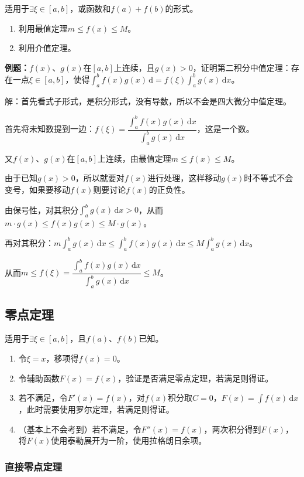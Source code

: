 适用于$\exists\xi\in[a,b]$，或函数和$f(a)+f(b)$的形式。

\begin{enumerate}
    \item 利用最值定理$m\leqslant f(x)\leqslant M$。
    \item 利用介值定理。
\end{enumerate}

\textbf{例题：}$f(x)$、$g(x)$在$[a,b]$上连续，且$g(x)>0$，证明第二积分中值定理：存在一点$\xi\in[a,b]$，使得$\int_a^bf(x)g(x)\,\textrm{d}=f(\xi)\int_a^bg(x)\,\textrm{d}x$。

解：首先看式子形式，是积分形式，没有导数，所以不会是四大微分中值定理。

首先将未知数提到一边：$f(\xi)=\dfrac{\int_a^bf(x)g(x)\,\textrm{d}x}{\int_a^bg(x)\,\textrm{d}x}$，这是一个数。

又$f(x)$、$g(x)$在$[a,b]$上连续，由最值定理$m\leqslant f(x)\leqslant M$。

由于已知$g(x)>0$，所以就要对$f(x)$进行处理，这样移动$g(x)$时不等式不会变号，如果要移动$f(x)$则要讨论$f(x)$的正负性。

由保号性，对其积分$\int_a^bg(x)\,\textrm{d}x>0$，从而$m\cdot g(x)\leqslant f(x)g(x)\leqslant M\cdot g(x)$。

再对其积分：$m\int_a^bg(x)\,\textrm{d}x\leqslant\int_a^bf(x)g(x)\,\textrm{d}x\leqslant M\int_a^bg(x)\,\textrm{d}x$。

从而$m\leqslant f(\xi)=\dfrac{\int_a^bf(x)g(x)\,\textrm{d}x}{\int_a^bg(x)\,\textrm{d}x}\leqslant M$。

\subsection{零点定理}

适用于$\exists\xi\in[a,b]$，且$f(a)$、$f(b)$已知。

\begin{enumerate}
    \item 令$\xi=x$，移项得$f(x)=0$。
    \item 令辅助函数$F(x)=f(x)$，验证是否满足零点定理，若满足则得证。
    \item 若不满足，令$F'(x)=f(x)$，对$f(x)$积分取$C=0$，$F(x)=\int f(x)\,\textrm{d}x$，此时需要使用罗尔定理，若满足则得证。
    \item （基本上不会考到）若不满足，令$F''(x)=f(x)$，两次积分得到$F(x)$，将$F(x)$使用泰勒展开为一阶，使用拉格朗日余项。
\end{enumerate}

\subsubsection{直接零点定理}

